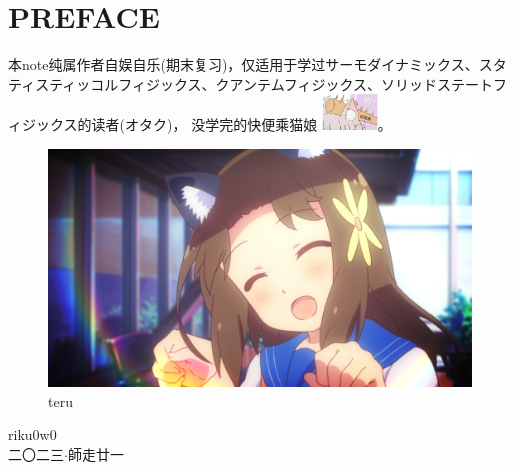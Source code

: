 \chapter*{PREFACE}

本note纯属作者自娱自乐(期末复习)，仅适用于学过\mincho サーモダイナミックス、スタティスティッコルフィジックス、クアンテムフィジックス、ソリッドステートフィジックス\FandolSong 的读者({\mincho オタク})，\vspace{1ex}
没学完的快便乘猫娘 \includegraphics[width=4em,align=c]{idiot.jpg}。
\begin{figure}[ht]
    \centering
    \includegraphics[width=\linewidth]{teru.png}
    \caption*{teru}
    \label{fig:teru-star}
\end{figure}

\begin{flushright}
	riku0w0 \\
	{\mincho 二〇二三$\cdot$師走廿一}\\
\end{flushright}

